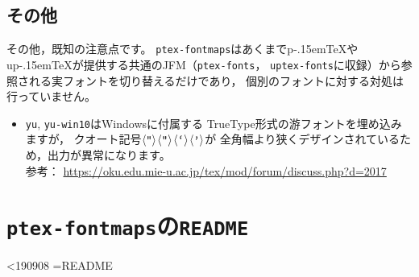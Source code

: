 \documentclass{jlreq}
\makeatletter
\def\loadprint#1{%
  \openin\xx@myread=#1\relax
  \@whilesw\unless\ifeof\xx@myread\fi{%
    \readline\xx@myread to \xx@dataline
    \expandafter\xx@striplf\xx@dataline\@nil
    \leavevmode\null\xx@dataline\par
  }%
  \closein\xx@myread
}
\def\file#1{\texttt{#1}}
\def\command#1{\texttt{#1}}
\def\codechar#1{\ensuremath{\langle\mbox{\texttt{#1}}\rangle}}
\def\pTeX{p\kern-.15em\TeX}
\def\upTeX{u\pTeX}
\makeatother
\begin{document}
\subsection{その他}

その他，既知の注意点です。
\file{ptex-fontmaps}はあくまで\pTeX や\upTeX が提供する共通のJFM（\file{ptex-fonts}，
\file{uptex-fonts}に収録）から参照される実フォントを切り替えるだけであり，
個別のフォントに対する対処は行っていません。

\begin{itemize}
  \item \command{yu}, \command{yu-win10}はWindowsに付属する
        TrueType形式の游フォントを埋め込みますが，
        クオート記号\codechar{“}\codechar{”}\codechar{‘}\codechar{’}が
        全角幅より狭くデザインされているため，出力が異常になります。\\
        参考： \url{https://oku.edu.mie-u.ac.jp/tex/mod/forum/discuss.php?d=2017}
\end{itemize}





\clearpage
\appendix


\section{\file{ptex-fontmaps}の\file{README}}\label{ptex-fontmaps-readme}

\ifnum\epTeXversion<190908\relax
\else
  {\frenchspacing\ttfamily\footnotesize\loadprint{README}}
\fi
\end{document}
